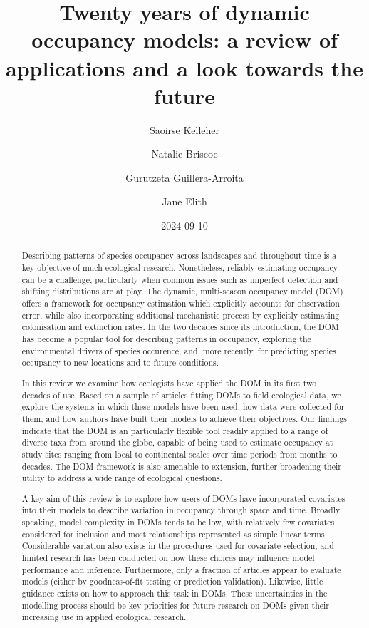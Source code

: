\documentclass[
]{article}
\title{Twenty years of dynamic occupancy models: a review of
applications and a look towards the future}
\author{Saoirse Kelleher \and Natalie Briscoe \and Gurutzeta
Guillera-Arroita \and Jane Elith}
\date{2024-09-10}
\begin{document}
\maketitle
\begin{abstract}
Describing patterns of species occupancy across landscapes and
throughout time is a key objective of much ecological research.
Nonetheless, reliably estimating occupancy can be a challenge,
particularly when common issues such as imperfect detection and shifting
distributions are at play. The dynamic, multi-season occupancy model
(DOM) offers a framework for occupancy estimation which explicitly
accounts for observation error, while also incorporating additional
mechanistic process by explicitly estimating colonisation and extinction
rates. In the two decades since its introduction, the DOM has become a
popular tool for describing patterns in occupancy, exploring the
environmental drivers of species occurence, and, more recently, for
predicting species occupancy to new locations and to future conditions.

In this review we examine how ecologists have applied the DOM in its
first two decades of use. Based on a sample of articles fitting DOMs to
field ecological data, we explore the systems in which these models have
been used, how data were collected for them, and how authors have built
their models to achieve their objectives. Our findings indicate that the
DOM is an particularly flexible tool readily applied to a range of
diverse taxa from around the globe, capable of being used to estimate
occupancy at study sites ranging from local to continental scales over
time periods from months to decades. The DOM framework is also amenable
to extension, further broadening their utility to address a wide range
of ecological questions.

A key aim of this review is to explore how users of DOMs have
incorporated covariates into their models to describe variation in
occupancy through space and time. Broadly speaking, model complexity in
DOMs tends to be low, with relatively few covariates considered for
inclusion and most relationships represented as simple linear terms.
Considerable variation also exists in the procedures used for covariate
selection, and limited research has been conducted on how these choices
may influence model performance and inference. Furthermore, only a
fraction of articles appear to evaluate models (either by
goodness-of-fit testing or prediction validation). Likewise, little
guidance exists on how to approach this task in DOMs. These
uncertainties in the modelling process should be key priorities for
future research on DOMs given their increasing use in applied ecological
research.
\end{abstract}
\end{document}
